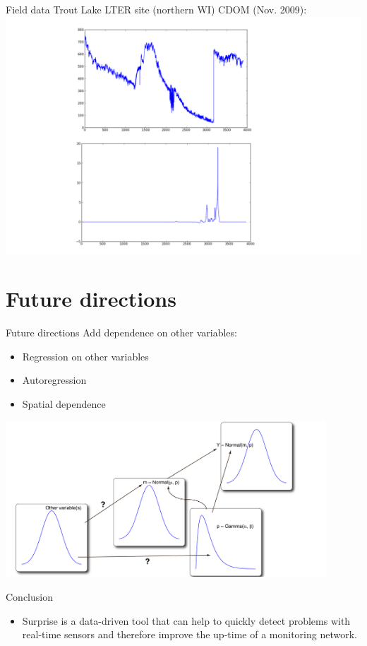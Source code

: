 \documentclass{beamer}
\begin{document}
\begin{frame}{Field data}
	Trout Lake LTER site (northern WI) CDOM (Nov. 2009):
	\includegraphics[width=\textwidth]{../../figures/troutlake}
\end{frame}


\section{Future directions}

\begin{frame}{Future directions}
	Add dependence on other variables:
	\begin{itemize}
		\item Regression on other variables
		\item Autoregression
		\item Spatial dependence
	\end{itemize}
	\includegraphics[width=0.9\textwidth]{../../figures/hierarchical-regression}
\end{frame}


\begin{frame}{Conclusion}
	\begin{itemize}
		\item Surprise is a data-driven tool that can help to quickly detect problems with real-time sensors and therefore improve the up-time of a monitoring network.
	\end{itemize}
\end{frame}
\end{document}
